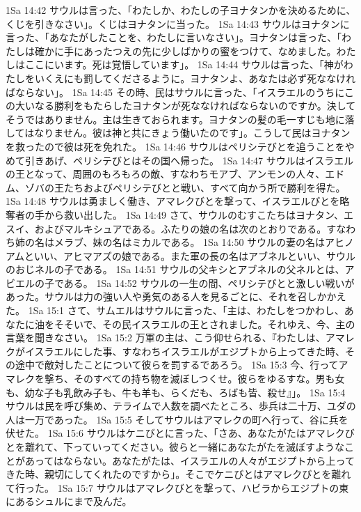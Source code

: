 1Sa 14:42  サウルは言った、「わたしか、わたしの子ヨナタンかを決めるために、くじを引きなさい」。くじはヨナタンに当った。
1Sa 14:43  サウルはヨナタンに言った、「あなたがしたことを、わたしに言いなさい」。ヨナタンは言った、「わたしは確かに手にあったつえの先に少しばかりの蜜をつけて、なめました。わたしはここにいます。死は覚悟しています」。
1Sa 14:44  サウルは言った、「神がわたしをいくえにも罰してくださるように。ヨナタンよ、あなたは必ず死ななければならない」。
1Sa 14:45  その時、民はサウルに言った、「イスラエルのうちにこの大いなる勝利をもたらしたヨナタンが死ななければならないのですか。決してそうではありません。主は生きておられます。ヨナタンの髪の毛一すじも地に落してはなりません。彼は神と共にきょう働いたのです」。こうして民はヨナタンを救ったので彼は死を免れた。
1Sa 14:46  サウルはペリシテびとを追うことをやめて引きあげ、ペリシテびとはその国へ帰った。
1Sa 14:47  サウルはイスラエルの王となって、周囲のもろもろの敵、すなわちモアブ、アンモンの人々、エドム、ゾバの王たちおよびペリシテびとと戦い、すべて向かう所で勝利を得た。
1Sa 14:48  サウルは勇ましく働き、アマレクびとを撃って、イスラエルびとを略奪者の手から救い出した。
1Sa 14:49  さて、サウルのむすこたちはヨナタン、エスイ、およびマルキシュアである。ふたりの娘の名は次のとおりである。すなわち姉の名はメラブ、妹の名はミカルである。
1Sa 14:50  サウルの妻の名はアヒノアムといい、アヒマアズの娘である。また軍の長の名はアブネルといい、サウルのおじネルの子である。
1Sa 14:51  サウルの父キシとアブネルの父ネルとは、アビエルの子である。
1Sa 14:52  サウルの一生の間、ペリシテびとと激しい戦いがあった。サウルは力の強い人や勇気のある人を見るごとに、それを召しかかえた。
1Sa 15:1  さて、サムエルはサウルに言った、「主は、わたしをつかわし、あなたに油をそそいで、その民イスラエルの王とされました。それゆえ、今、主の言葉を聞きなさい。
1Sa 15:2  万軍の主は、こう仰せられる、『わたしは、アマレクがイスラエルにした事、すなわちイスラエルがエジプトから上ってきた時、その途中で敵対したことについて彼らを罰するであろう。
1Sa 15:3  今、行ってアマレクを撃ち、そのすべての持ち物を滅ぼしつくせ。彼らをゆるすな。男も女も、幼な子も乳飲み子も、牛も羊も、らくだも、ろばも皆、殺せ』」。
1Sa 15:4  サウルは民を呼び集め、テライムで人数を調べたところ、歩兵は二十万、ユダの人は一万であった。
1Sa 15:5  そしてサウルはアマレクの町へ行って、谷に兵を伏せた。
1Sa 15:6  サウルはケニびとに言った、「さあ、あなたがたはアマレクびとを離れて、下っていってください。彼らと一緒にあなたがたを滅ぼすようなことがあってはならない。あなたがたは、イスラエルの人々がエジプトから上ってきた時、親切にしてくれたのですから」。そこでケニびとはアマレクびとを離れて行った。
1Sa 15:7  サウルはアマレクびとを撃って、ハビラからエジプトの東にあるシュルにまで及んだ。
